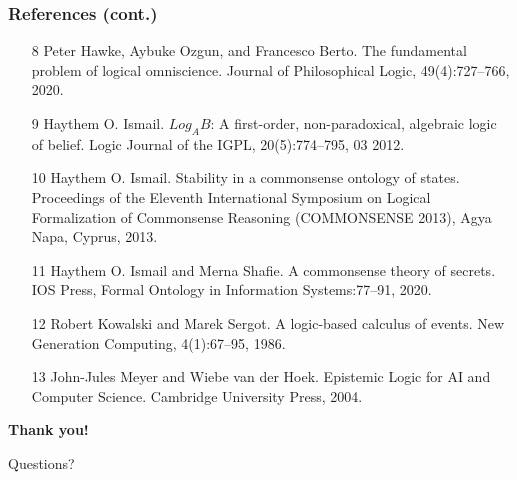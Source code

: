 \documentclass[aspectratio=169]{beamer}
\begin{document}
\begin{frame}
\frametitle{References (cont.)}
\footnotesize
\begin{itemize}
    \item [8] Peter Hawke, Aybuke Ozgun, and Francesco Berto. The fundamental problem of
    logical omniscience. Journal of Philosophical Logic, 49(4):727–766, 2020.
    \item [9] Haythem O. Ismail. $Log_AB$: A first-order, non-paradoxical, algebraic logic of belief.
    Logic Journal of the IGPL, 20(5):774–795, 03 2012.
    \item [10] Haythem O. Ismail. Stability in a commonsense ontology of states. Proceedings of
    the Eleventh International Symposium on Logical Formalization of Commonsense
    Reasoning (COMMONSENSE 2013), Agya Napa, Cyprus, 2013.
    \item [11] Haythem O. Ismail and Merna Shafie. A commonsense theory of secrets. IOS Press,
    Formal Ontology in Information Systems:77–91, 2020.
    \item [12] Robert Kowalski and Marek Sergot. A logic-based calculus of events. New Generation
    Computing, 4(1):67–95, 1986.
    \item [13] John-Jules Meyer and Wiebe van der Hoek. Epistemic Logic for AI and Computer
    Science. Cambridge University Press, 2004.
\end{itemize}
\end{frame}
  

\begin{frame}[c]
\centering
\Huge
\textbf{Thank you!}

\vspace{1cm}

\LARGE
Questions?
\end{frame}

\end{document}
